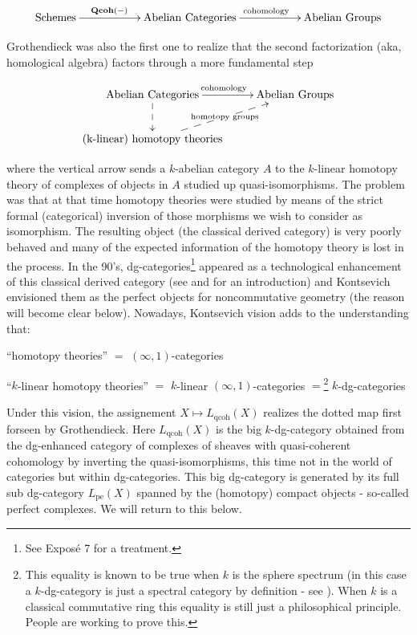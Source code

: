 \begin{refsection}
$$
\xymatrix{
\mathrm{Schemes} \ar[rr]^(0.4){\Qcoh(-)}&& \text{Abelian Categories}\ar[rr]^{\text{cohomology}}&& \text{Abelian Groups} 
}
$$

Grothendieck was also the first one to realize that the second factorization (aka, homological algebra) factors through a more fundamental step

$$
\xymatrix{
\text{Abelian Categories}\ar@{-->}[d]\ar[r]^{\text{cohomology}}& \text{Abelian Groups} \\
\text{(k-linear) homotopy theories}\ar@{-->}[ru]|-{\text{homotopy groups}}&
}
$$

\noindent where the vertical arrow sends a $k$-abelian category $A$ to the $k$-linear homotopy theory of complexes of objects in $A$ studied up quasi-isomorphisms. 
The problem was that at that time homotopy theories were studied by means of the strict formal (categorical) inversion of those morphisms we wish to consider as isomorphism. The resulting object (the classical derived category) is very poorly behaved and many of the expected information of the homotopy theory is lost in the process. In the 90's, dg-categories\footnote{See Expos\'e 7 for a treatment.} appeared as a technological enhancement of this classical derived category (see \cite{bondal-kapranov3,bondal-kapranov2,bondal-kapranov} and \cite{ondgcategories, sedano} for an introduction) and Kontsevich envisioned them as the perfect objects for noncommutative geometry (the reason will become clear below). Nowadays, Kontsevich vision adds to the understanding that:\\

\begin{center}
``homotopy theories'' $=$ $(\infty,1)$-categories\\
\end{center}

\begin{center}
``$k$-linear homotopy theories'' $=$ $k$-linear $(\infty,1)$-categories $=$\footnote{This equality is known to be true when $k$ is the sphere spectrum (in this case a $k$-dg-category is just a spectral category by definition - see \cite{tabuada-gepner}). When $k$ is a classical commutative ring this equality is still just a philosophical principle. People are working to prove this.} $k$-dg-categories\\
\end{center}


Under this vision, the assignement $X\mapsto L_{\mathrm{qcoh}}(X)$ realizes the dotted map first forseen by Grothendieck. Here $L_{\mathrm{qcoh}}(X)$ is the big $k$-dg-category obtained from the dg-enhanced category of complexes of sheaves with quasi-coherent cohomology by inverting the quasi-isomorphisms, this time not in the world of categories but within dg-categories. This big dg-category is generated by its full sub dg-category $L_\mathrm{pe}(X)$ spanned by the (homotopy) compact objects - so-called perfect complexes. We will return to this below. \\


\end{refsection}
